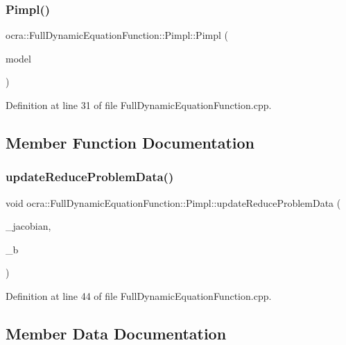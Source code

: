 \subsubsection{\texorpdfstring{Pimpl()}{Pimpl()}}
{\footnotesize\ttfamily ocra\+::\+Full\+Dynamic\+Equation\+Function\+::\+Pimpl\+::\+Pimpl (\begin{DoxyParamCaption}\item[{const \hyperlink{classocra_1_1Model}{Model} \&}]{model }\end{DoxyParamCaption})\hspace{0.3cm}{\ttfamily [inline]}}



Definition at line 31 of file Full\+Dynamic\+Equation\+Function.\+cpp.



\subsection{Member Function Documentation}
\hypertarget{structFullDynamicEquationFunction_1_1Pimpl_a4d1df4cadec603942aeb750212a2d258}{}\label{structFullDynamicEquationFunction_1_1Pimpl_a4d1df4cadec603942aeb750212a2d258} 
\subsubsection{\texorpdfstring{update\+Reduce\+Problem\+Data()}{updateReduceProblemData()}}
{\footnotesize\ttfamily void ocra\+::\+Full\+Dynamic\+Equation\+Function\+::\+Pimpl\+::update\+Reduce\+Problem\+Data (\begin{DoxyParamCaption}\item[{const Eigen\+::\+Matrix\+Xd \&}]{\+\_\+jacobian,  }\item[{const Eigen\+::\+Vector\+Xd \&}]{\+\_\+b }\end{DoxyParamCaption})\hspace{0.3cm}{\ttfamily [inline]}}



Definition at line 44 of file Full\+Dynamic\+Equation\+Function.\+cpp.



\subsection{Member Data Documentation}
\hypertarget{structFullDynamicEquationFunction_1_1Pimpl_a795bb07591fdf52c4b60cccfb6b3e811}{}\label{structFullDynamicEquationFunction_1_1Pimpl_a795bb07591fdf52c4b60cccfb6b3e811} 
